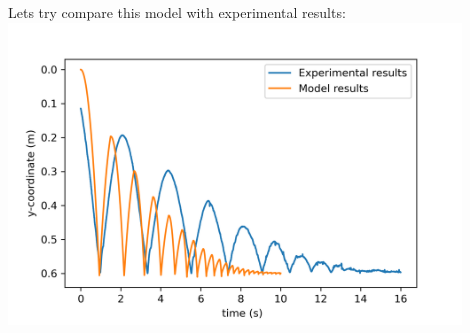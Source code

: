 \documentclass[a4paper,11pt,oneside,article]{memoir}
\begin{document}
Lets try compare this model with experimental results:\\
\includegraphics[width=12cm]{images/pic4.png}\\
\end{document}
